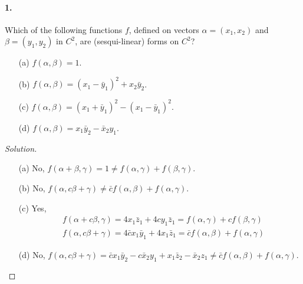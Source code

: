 \documentclass{article}
\theoremstyle{plain}
\theoremstyle{definition}
\theoremstyle{remark}
\begin{document}
    \paragraph{1.} Which of the following functions $f$, defined on vectors $\alpha = (x_1, x_2)$ and $\beta =
      (y_1, y_2)$ in $C^2$, are (sesqui-linear) forms on $C^2$?
        \begin{itemize}
              \item[(a)] $f(\alpha,\beta) =1$.
              \item[(b)] $f(\alpha,\beta) =(x_1  -\bar{y}_1)^2 + x_2\bar{y}_2$.
              \item[(c)] $f(\alpha,\beta) = (x_1 + \bar{y}_1)^2 - (x_1-\bar{y}_1)^2$.
              \item[(d)] $f(\alpha,\beta) = x_1\bar{y}_2 - \bar{x}_2y_1$.
        \end{itemize}
      \begin{proof}[Solution]$ $
        \begin{itemize}
              \item[(a)] No, $f(\alpha+\beta,\gamma) = 1 \neq f(\alpha,\gamma)+f(\beta,\gamma)$.
              \item[(b)] No, $f(\alpha,c\beta+\gamma) \neq \bar{c}f(\alpha,\beta) +f(\alpha,\gamma)$.
              \item[(c)] Yes,
                  \begin{align*}
                    &f(\alpha + c\beta,\gamma)  = 4 x_1 \bar{z}_1 +  4cy_1\bar{z}_1=f (\alpha,\gamma) +cf(\beta,\gamma)\\
                    &f(\alpha, c\beta +  \gamma)  = 4\bar{c} x_1\bar{y}_1 + 4 x_1 \bar{z}_1 = \bar{c}f(\alpha,\beta) +f(\alpha,\gamma)
                  \end{align*}
              \item[(d)] No, $f(\alpha,c\beta + \gamma) = \bar{c} x_1\bar{y}_2 - c \bar{x}_2y_1 +x_1\bar{z}_2 -  \bar{x}_2z_1 \neq  \bar{c}f(\alpha,\beta) + f(\alpha,\gamma)$.
        \end{itemize}
      \end{proof}
\end{document}
